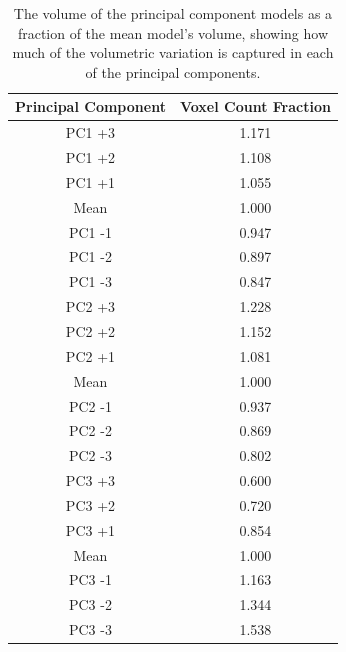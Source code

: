 \begin{table}[p]
\centering
\caption{The volume of the principal component models as a fraction of the mean model's volume, showing how much of the volumetric variation is captured in each of the principal components. }
\label{tab:pc_vol}
\begin{tabular}{c|c}
Principal Component & Voxel Count Fraction       \\ \hline \hline
PC1 +3               & 1.171 \\
PC1 +2               & 1.108 \\
PC1 +1               & 1.055 \\
Mean                 & 1.000 \\
PC1 -1               & 0.947 \\
PC1 -2               & 0.897 \\
PC1 -3               & 0.847 \\ \hline

PC2 +3               & 1.228 \\
PC2 +2               & 1.152 \\
PC2 +1               & 1.081 \\
Mean                 & 1.000 \\
PC2 -1               & 0.937 \\
PC2 -2               & 0.869 \\
PC2 -3               & 0.802 \\ \hline

PC3 +3               & 0.600 \\
PC3 +2               & 0.720 \\
PC3 +1               & 0.854 \\
Mean                 & 1.000 \\
PC3 -1               & 1.163 \\
PC3 -2               & 1.344 \\
PC3 -3               & 1.538 \\ \hline
\end{tabular}
\end{table}


